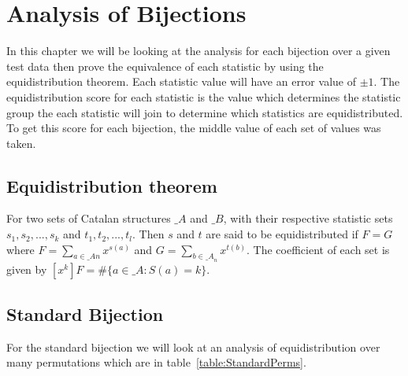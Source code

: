\documentclass[12pt]{article}
\begin{document}
\section{Analysis of Bijections}
In this chapter we will be looking at the analysis for each bijection over a given test data then prove the equivalence of each statistic by using the equidistribution theorem. Each statistic value will have an error value of $\pm 1$. The equidistribution score for each statistic is the value which determines the statistic group the each statistic will join to determine which statistics are equidistributed. To get this score for each bijection, the middle value of each set of values was taken.

\subsection{Equidistribution theorem}
For two sets of Catalan structures $\mathcal_{A}$ and $\mathcal_{B}$, with their respective statistic sets $s_1, s_2,..., s_k$ and $t_1, t_2,...,t_l$. Then $s$ and $t$ are said to be equidistributed if $F = G$ where $F = {\sum_{a \in {\mathcal_{A}}n}} x^{s(a)}$ and $G = {\sum_{b \in {\mathcal_{A}}_n}} x^{t(b)}$. The coefficient of each set is given by $[x^k]F = \#\{a \in {\mathcal_{A}} : S(a) = k\}$.

\subsection{Standard Bijection}
For the standard bijection we will look at an analysis of equidistribution over many permutations which are in table~\ref{table:StandardPerms}. 
\end{document}

